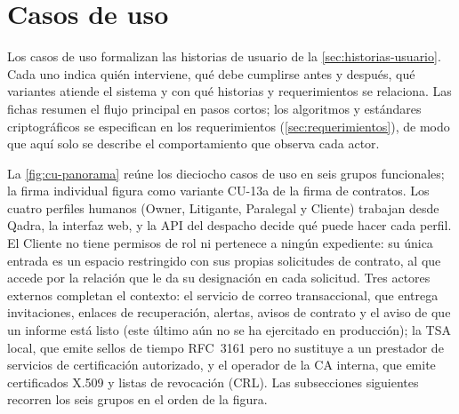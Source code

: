\section{Casos de uso}\label{sec:casos-uso}

\newcommand{\CUbFicha}[1]{\par\medskip\Needspace{7\baselineskip}\begingroup
  \captionof{table}{#1}}
\newcommand{\CUbFila}[3][]{\par\ifx b#1\nopagebreak[4]\fi\noindent
  \begin{tabularx}{\linewidth}{@{}>{\bfseries}L{2.65cm} X@{}}
    \ifx t#1\toprule\fi #2 & #3 \\ \ifx b#1\bottomrule\fi
  \end{tabularx}\par}
\newcommand{\CUbFin}{\endgroup\par\medskip}

Los casos de uso formalizan las historias de usuario de la \cref{sec:historias-usuario}. Cada uno indica quién interviene, qué debe cumplirse antes y después, qué variantes atiende el sistema y con qué historias y requerimientos se relaciona. Las fichas resumen el flujo principal en pasos cortos; los algoritmos y estándares criptográficos se especifican en los requerimientos (\cref{sec:requerimientos}), de modo que aquí solo se describe el comportamiento que observa cada actor.

La \cref{fig:cu-panorama} reúne los dieciocho casos de uso en seis grupos funcionales; la firma individual figura como variante CU-13a de la firma de contratos. Los cuatro perfiles humanos (Owner, Litigante, Paralegal y Cliente) trabajan desde Qadra, la interfaz web, y la API del despacho decide qué puede hacer cada perfil. El Cliente no tiene permisos de rol ni pertenece a ningún expediente: su única entrada es un espacio restringido con sus propias solicitudes de contrato, al que accede por la relación que le da su designación en cada solicitud. Tres actores externos completan el contexto: el servicio de correo transaccional, que entrega invitaciones, enlaces de recuperación, alertas, avisos de contrato y el aviso de que un informe está listo (este último aún no se ha ejercitado en producción); la TSA local, que emite sellos de tiempo RFC~3161 pero no sustituye a un prestador de servicios de certificación autorizado, y el operador de la CA interna, que emite certificados X.509 y listas de revocación (CRL). Las subsecciones siguientes recorren los seis grupos en el orden de la figura.


